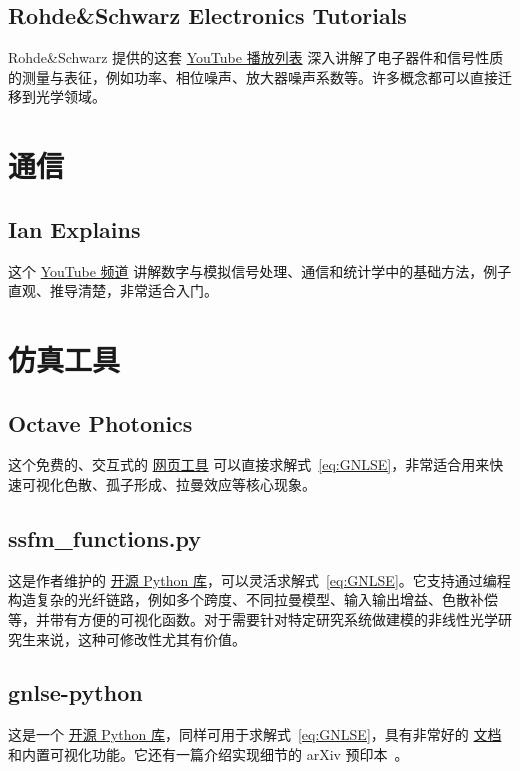 \subsection*{Rohde\&Schwarz Electronics Tutorials}
Rohde\&Schwarz 提供的这套
\href{https://www.youtube.com/watch?v=rUDMo7hwihs&list=PLKxVoO5jUTlvsVtDcqrVn0ybqBVlLj2z8}{YouTube 播放列表} 深入讲解了电子器件和信号性质的测量与表征，例如功率、相位噪声、放大器噪声系数等。许多概念都可以直接迁移到光学领域。



\section{通信}


\subsection*{Ian Explains}
这个 \href{https://www.youtube.com/@iain_explains/videos}{YouTube 频道} 讲解数字与模拟信号处理、通信和统计学中的基础方法，例子直观、推导清楚，非常适合入门。


\section{仿真工具}

\subsection*{Octave Photonics}
这个免费的、交互式的 \href{https://www.octavephotonics.com/nlse}{网页工具} 可以直接求解式~\ref{eq:GNLSE}，非常适合用来快速可视化色散、孤子形成、拉曼效应等核心现象。

\subsection*{ssfm\_functions.py}
这是作者维护的 \href{https://github.com/OleKrarup123/NLSE-vector-solver/tree/main}{开源 Python 库}，可以灵活求解式~\ref{eq:GNLSE}。它支持通过编程构造复杂的光纤链路，例如多个跨度、不同拉曼模型、输入输出增益、色散补偿等，并带有方便的可视化函数。对于需要针对特定研究系统做建模的非线性光学研究生来说，这种可修改性尤其有价值。

\subsection*{gnlse-python}
这是一个 \href{https://github.com/WUST-FOG/gnlse-python}{开源 Python 库}，同样可用于求解式~\ref{eq:GNLSE}，具有非常好的 \href{https://gnlse.readthedocs.io/en/latest/index.html}{文档} 和内置可视化功能。它还有一篇介绍实现细节的 arXiv 预印本~\cite{redman2021gnlsepythonopensourcesoftware}。

